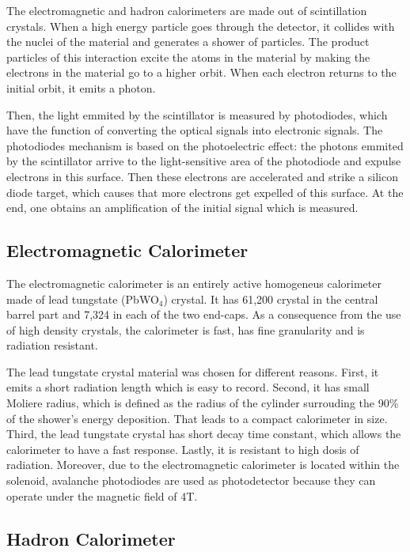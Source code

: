The electromagnetic and hadron calorimeters are made out of scintillation crystals. When a high energy particle goes through the detector, it collides with the nuclei of the material and generates a shower of particles. The product particles of this interaction excite the atoms in the material by making the electrons in the material go to a higher orbit. When each electron returns to the initial orbit, it emits a photon. 

Then, the light emmited by the scintillator is measured by photodiodes, which have the function of converting the optical signals into electronic signals. The photodiodes mechanism is based on the photoelectric effect: the photons emmited by the scintillator arrive to the light-sensitive area of the photodiode and expulse electrons in this surface. Then these electrons are accelerated and strike a silicon diode target, which causes that more electrons get expelled of this surface. At the end, one obtains an amplification of the initial signal which is measured.

\subsection{Electromagnetic Calorimeter}

The electromagnetic calorimeter is an entirely active homogeneus calorimeter made of lead tungstate (PbWO$_4$) crystal. It has 61,200 crystal in the central barrel part and 7,324  in each of the two end-caps. As a consequence from the use of high density crystals, the calorimeter is fast, has fine granularity and is radiation resistant. 

The lead tungstate crystal material was chosen for different reasons. First, it emits a short radiation length which is easy to record. Second, it has small Moliere radius, which is defined as the radius of the cylinder surrouding the 90\% of the shower's energy deposition. That leads to a compact calorimeter in size. Third, the lead tungstate crystal has short decay time constant, which allows the calorimeter to have a fast response. Lastly, it is resistant to high dosis of radiation. Moreover, due to the electromagnetic calorimeter is located within the solenoid, avalanche photodiodes are used as photodetector because they can operate under the magnetic field of 4T. 

\subsection{Hadron Calorimeter}

